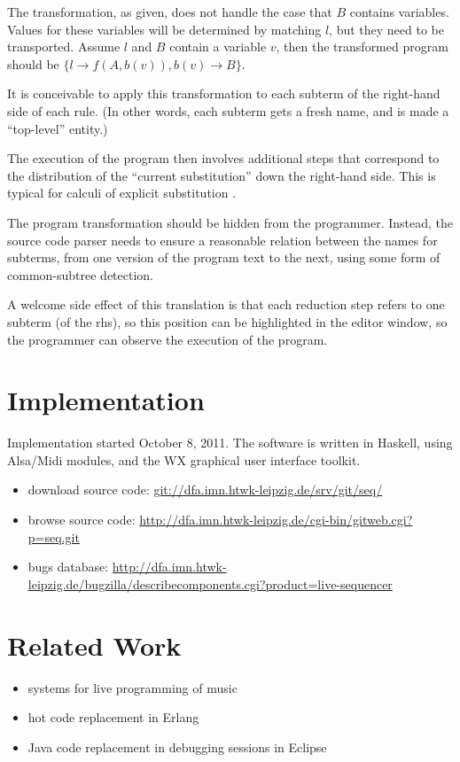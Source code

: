 \documentclass[a4paper]{easychair}
\begin{document}
The transformation, as given, does not handle the case
that $B$ contains variables. 
Values for these variables will be determined by matching $l$, 
but they need to be transported. 
Assume $l$ and $B$ contain a variable $v$,
then the transformed program should be $\{l \to f(A,b(v)), b(v) \to B\}$.

It is conceivable to apply this transformation
to each subterm of the right-hand side of each rule.
(In other words, each subterm gets a fresh name,
and is made a ``top-level'' entity.)

The execution of the program then involves additional steps
that correspond to the distribution of the ``current substitution''
down the right-hand side. This is typical for calculi
of explicit substitution \cite{DBLP:conf/popl/Lescanne94}.

The program transformation should be hidden from the programmer.
Instead, the source code parser needs to ensure a reasonable relation
between the names for subterms, from one version of the program text
to the next, using some form of common-subtree detection.

A welcome side effect of this translation is that
each reduction step refers to one subterm (of the rhs),
so this position can be highlighted in the editor window,
so the programmer can observe the execution of the program.

\section{Implementation}

Implementation started October 8, 2011.
The software is written in Haskell,
using Alsa/Midi modules,
and the WX graphical user interface toolkit.

\begin{itemize}
\item download source code: \url{git://dfa.imn.htwk-leipzig.de/srv/git/seq/}
\item browse source code: \url{http://dfa.imn.htwk-leipzig.de/cgi-bin/gitweb.cgi?p=seq.git}
\item bugs database: \url{http://dfa.imn.htwk-leipzig.de/bugzilla/describecomponents.cgi?product=live-sequencer}
\end{itemize}

\section{Related Work}

\begin{itemize}
\item systems for live programming of music
\item hot code replacement in Erlang
\item Java code replacement in debugging sessions in Eclipse
\end{itemize}



\end{document}
